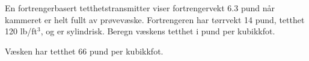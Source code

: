 

En fortrengerbasert tetthetstransmitter viser fortrengervekt 6.3 pund når kammeret er helt fullt av prøvevæske.  Fortrengeren har tørrvekt 14 pund, tetthet 120 lb/ft$^{3}$, og er sylindrisk.  Beregn væskens tetthet i pund per kubikkfot.







Væsken har tetthet 66 pund per kubikkfot.









